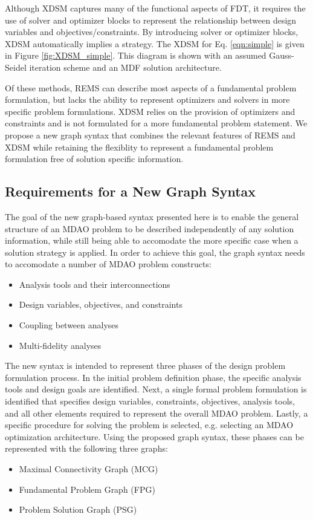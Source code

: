     Although XDSM captures many of the functional aspects of FDT, it 
    requires the use of solver and optimizer blocks to represent 
    the relationship between design variables and objectives/constraints. 
    By introducing solver or optimizer blocks, XDSM automatically implies a strategy. 
    The XDSM for Eq. \ref{eqn:simple} is given in Figure \ref{fig:XDSM_simple}. 
    This diagram is shown with an 
    assumed Gauss-Seidel iteration scheme and an MDF solution architecture. 

    Of these methods, REMS can describe most aspects of a fundamental 
    problem formulation, but lacks the ability to represent optimizers and 
    solvers in more specific problem formulations. XDSM relies on the provision of  
    optimizers and constraints and is not formulated  
    for a more fundamental problem statement. We propose a new graph syntax that 
    combines the relevant features of REMS and XDSM while retaining the flexiblity to 
    represent a fundamental problem formulation free of solution specific information. 

\subsection{Requirements for a New Graph Syntax}
  \label{s:requirements}
  The goal of the new graph-based syntax presented here is to enable the general 
  structure of an MDAO problem to be described independently of any solution information, 
  while still being able to accomodate the more specific case when a solution 
  strategy is applied. In order to achieve this goal, 
  the graph syntax needs to accomodate a number of MDAO problem constructs: 
  \begin{itemize}
    \item Analysis tools and their interconnections
    \item Design variables, objectives, and constraints
    \item Coupling between analyses
    \item Multi-fidelity analyses
  \end{itemize}

  The new syntax is intended to represent three phases of the design problem 
  formulation process. In the initial problem definition phase, the specific 
  analysis tools and design goals are identified. Next, a single formal problem 
  formulation is identified that specifies design variables, constraints, 
  objectives, analysis tools, and all other elements required to represent 
  the overall MDAO problem. Lastly, a specific procedure for solving the problem 
  is selected, e.g. selecting an MDAO optimization architecture. Using 
  the proposed graph syntax, these phases can be represented with the following 
  three graphs:
  \begin{itemize}
    \item Maximal Connectivity Graph (MCG)
    \item Fundamental Problem Graph (FPG)
    \item Problem Solution Graph (PSG)
  \end{itemize}

